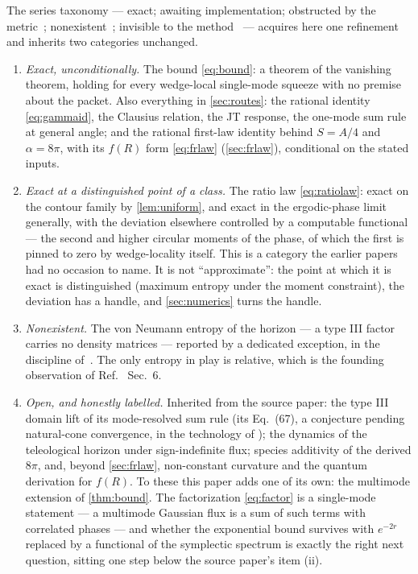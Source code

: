 \documentclass[11pt,a4paper]{article}
\theoremstyle{plain}
\theoremstyle{definition}
\begin{document}
The series taxonomy --- exact; awaiting implementation; obstructed by the
metric~\cite{SuppMath}; nonexistent~\cite{SuppStrings}; invisible to the
method~\cite{SuppTwistor} --- acquires here one refinement and inherits two
categories unchanged.

\begin{enumerate}[leftmargin=2em]
\item \emph{Exact, unconditionally.} The bound \cref{eq:bound}: a theorem
of the vanishing theorem, holding for every wedge-local single-mode squeeze
with no premise about the packet. Also everything in \cref{sec:routes}: the
rational identity \cref{eq:gammaid}, the Clausius relation, the JT response,
the one-mode sum rule at general angle; and the rational first-law
identity behind $S = A/4$ and $\alpha = 8\pi$, with its $f(R)$ form
\cref{eq:frlaw} (\cref{sec:frlaw}), conditional on the stated inputs.

\item \emph{Exact at a distinguished point of a class.} The ratio law
\cref{eq:ratiolaw}: exact on the contour family by \cref{lem:uniform}, and
exact in the ergodic-phase limit generally, with the deviation elsewhere
controlled by a computable functional --- the second and higher circular
moments of the phase, of which the first is pinned to zero by wedge-locality
itself. This is a category the earlier papers had no occasion to name. It
is not ``approximate'': the point at which it is exact is distinguished
(maximum entropy under the moment constraint), the deviation has a
handle, and \cref{sec:numerics} turns the handle.

\item \emph{Nonexistent.} The von Neumann entropy of the horizon --- a type
III factor carries no density matrices --- reported by a dedicated
exception, in the discipline of~\cite{SuppStrings}. The only entropy in play
is relative, which is the founding observation of Ref.~\cite{NariaiI}
Sec.~6.

\item \emph{Open, and honestly labelled.} Inherited from the source paper:
the type III domain lift of its mode-resolved sum rule (its Eq.~(67), a
conjecture pending natural-cone convergence, in the technology of
\cite{Longo2019,CLR2020,Shale1962}); the dynamics of the teleological
horizon under sign-indefinite flux; species additivity of the derived
$8\pi$, and, beyond \cref{sec:frlaw}, non-constant curvature and the quantum
derivation for $f(R)$. To these this paper adds one of its own: the multimode extension of
\cref{thm:bound}. The factorization \cref{eq:factor} is a single-mode
statement --- a multimode Gaussian flux is a sum of such terms with
correlated phases --- and whether the exponential bound survives with
$e^{-2r}$ replaced by a functional of the symplectic spectrum is exactly
the right next question, sitting one step below the source paper's item
(ii).
\end{enumerate}
\end{document}
